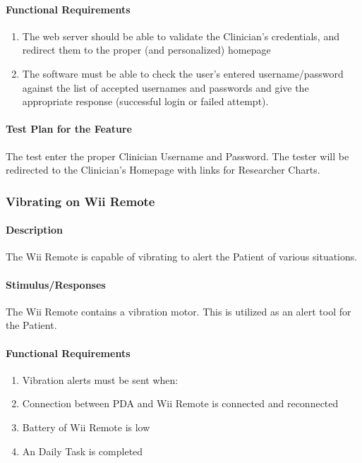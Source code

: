 \documentclass{article}
\begin{document}
\paragraph{Functional Requirements}
\begin{enumerate}
\item The web server should be able to validate the Clinician's credentials, and redirect them to the proper (and personalized) homepage
\item The software must be able to check the user's entered username/password against the list of accepted usernames and passwords and give the appropriate response (successful login or failed attempt).
\end{enumerate}

\paragraph{Test Plan for the Feature}
The test enter the proper Clinician Username and Password. The tester will be redirected to the Clinician's Homepage with links for Researcher Charts.  

\subsubsection {Vibrating on Wii Remote}\label{sec: Wii Vibrate}
\paragraph {Description}
The Wii Remote is capable of vibrating to alert the Patient of various situations.

\paragraph {Stimulus/Responses}
The Wii Remote contains a vibration motor. This is utilized as an alert tool for the Patient.


\paragraph {Functional Requirements}
\begin{enumerate}
\item Vibration alerts must be sent when:
\item Connection between PDA and Wii Remote is connected and reconnected
\item Battery of Wii Remote is low
\item An Daily Task is completed
\end{enumerate}
\end{document}
